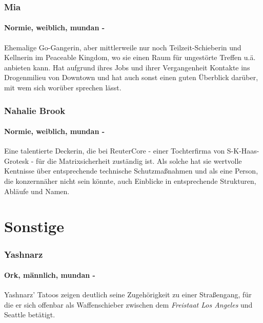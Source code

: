     \subsubsection{Mia}
    \paragraph{Normie, weiblich, mundan -} Ehemalige Go-Gangerin, aber mittlerweile nur noch Teilzeit-Schieberin und Kellnerin im Peaceable Kingdom, wo sie einen Raum für ungestörte Treffen u.ä. anbieten kann. Hat aufgrund ihres Jobs und ihrer Vergangenheit Kontakte ins Drogenmilieu von Downtown und hat auch sonst einen guten Überblick darüber, mit wem sich worüber sprechen lässt.
    
    \subsubsection{Nahalie Brook}
    \paragraph{Normie, weiblich, mundan -} Eine talentierte Deckerin, die bei ReuterCore - einer Tochterfirma von S-K-Haas-Grotesk - für die Matrixsicherheit zuständig ist. Als solche hat sie wertvolle Kentnisse über entsprechende technische Schutzmaßnahmen und als eine Person, die konzernnäher nicht sein könnte, auch Einblicke in entsprechende Strukturen, Abläufe und Namen.
    
    
\section{Sonstige}

    \subsubsection{Yashnarz}
    \paragraph{Ork, männlich, mundan -} Yashnarz' Tatoos zeigen deutlich seine Zugehörigkeit zu einer Straßengang, für die er sich offenbar als Waffenschieber zwischen dem \textit{Freistaat Los Angeles} und Seattle betätigt.
